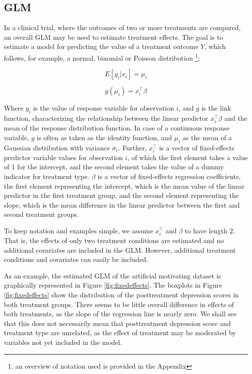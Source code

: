 \documentclass[nobf,doc]{apa}
\begin{document}
\subsection{GLM}
In a clinical trial, where the outcomes of two or more treatments are compared, an overall GLM may be used to estimate treatment effects. The goal is to estimate a model for predicting the value of a treatment outcome $Y$, which follows, for example, a normal, binomial or Poisson distribution \footnote{ an overview of notation used is provided in the Appendix}:

\begin{equation}
\label{eq:expected value}
	E[y_i | x_i] = \mu_i 
\end{equation}

\begin{equation}
\label{eq:fixedeffects}
	g(\mu_{i}) = x_{i}^{\top}\beta 
\end{equation}

Where $y_i$ is the value of response variable for observation $i$, and $g$ is the link function, characterizing the relationship between the linear predictor $x_{i}^{\top}\beta$ and the mean of the response distribution function. In case of a continuous response variable, $g$ is often as taken as the identity function, and $\mu_{i}$ as the mean of a Gaussian distribution with variance $\sigma_{\epsilon}$. Further, $x_{i}^{\top}$ is a vector of fixed-effects predictor variable values for observation $i$, of which the first element takes a value of 1 for the intercept, and the second element takes the value of a dummy indicator for treatment type. $\beta$ is a vector of fixed-effects regression coefficients, the first element representing the intercept, which is the mean value of the linear predictor in the first treatment group, and the second element representing the slope, which is the mean difference in the linear predictor between the first and second treatment groups.  

To keep notation and examples simple, we assume $x_{i}^{\top}$ and $\beta$ to have length 2. That is, the effects of only two treatment conditions are estimated and no additional covariates are included in the GLM. However, additional treatment conditions and covariates can easily be included.

As an example, the estimated GLM of the artificial motivating dataset is graphically represented in Figure \ref{fig:fixedeffects}. The boxplots in Figure \ref{fig:fixedeffects} show the distribution of the posttreatment depression scores in both treatment groups. There seems to be little overall difference in effects of both treatments, as the slope of the regression line is nearly zero. We shall see that this does not necessarily mean that posttreatment depression score and treatment type are unrelated, as the effect of treatment may be moderated by variables not yet included in the model.
\end{document}
